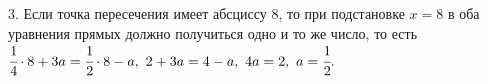 3. Если точка пересечения имеет абсциссу 8, то при подстановке $x=8$ в оба уравнения прямых должно получиться одно и то же число, то есть
$\cfrac{1}{4}\cdot8+3a=\cfrac{1}{2}\cdot8-a,\ 2+3a=4-a,\ 4a=2,\ a=\cfrac{1}{2}.$\\
